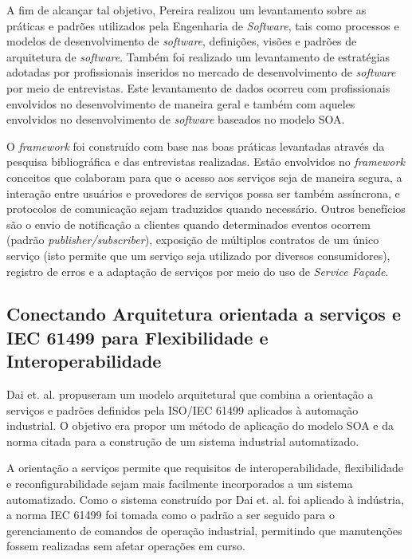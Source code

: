 A fim de alcançar tal objetivo, Pereira realizou um levantamento sobre as práticas e padrões utilizados pela Engenharia de \textit{Software}, tais como processos e modelos de desenvolvimento de \textit{software}, definições, visões e padrões de arquitetura de \textit{software}. Também foi realizado um levantamento de estratégias adotadas por profissionais inseridos no mercado de desenvolvimento de \textit{software} por meio de entrevistas. Este levantamento de dados ocorreu com profissionais envolvidos no desenvolvimento de maneira geral e também com aqueles envolvidos no desenvolvimento de \textit{software} baseados no modelo SOA.

O \textit{framework} foi construído com base nas boas práticas levantadas através da pesquisa bibliográfica e das entrevistas realizadas. Estão envolvidos no \textit{framework} conceitos que colaboram para que o acesso aos serviços seja de maneira segura, a interação entre usuários e provedores de serviços possa ser também assíncrona, e protocolos de comunicação sejam traduzidos quando necessário. Outros benefícios são o envio de notificação a clientes quando determinados eventos ocorrem (padrão \textit{publisher/subscriber}), exposição de múltiplos contratos de um único serviço (isto permite que um serviço seja utilizado por diversos consumidores), registro de erros e a adaptação de serviços por meio do uso de \textit{Service Façade}.

\subsection{Conectando Arquitetura orientada a serviços e IEC 61499 para Flexibilidade e Interoperabilidade}

Dai et. al. \cite{dai_bridging_2015} propuseram um modelo arquitetural que combina a orientação a serviços e padrões definidos pela ISO/IEC 61499 aplicados à automação industrial. O objetivo era propor um método de aplicação do modelo SOA e da norma citada para a construção de um sistema industrial automatizado.

A orientação a serviços permite que requisitos de interoperabilidade, flexibilidade e reconfigurabilidade sejam mais facilmente incorporados a um sistema automatizado. Como o sistema construído por Dai et. al. \cite{dai_bridging_2015} foi aplicado à indústria, a norma IEC 61499 foi tomada como o padrão a ser seguido para o gerenciamento de comandos de operação industrial, permitindo que manutenções fossem realizadas sem afetar operações em curso.

